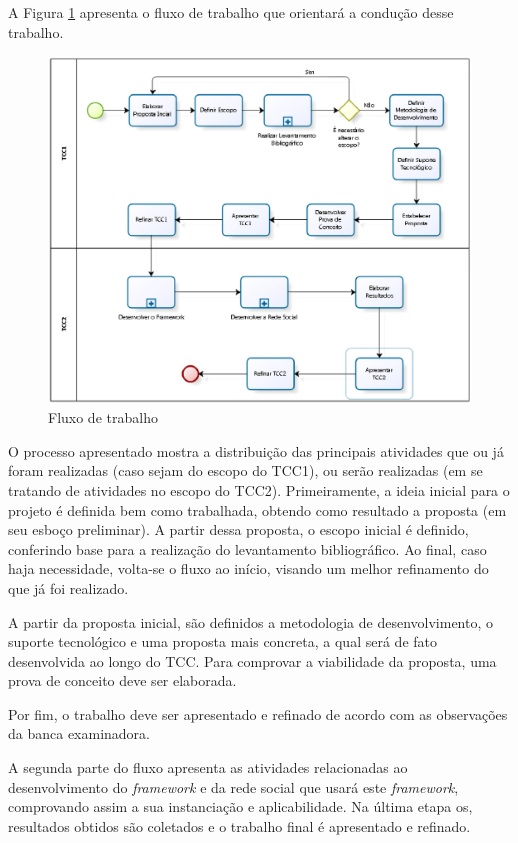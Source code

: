 A Figura \ref{processo tcc} apresenta o fluxo de trabalho que orientará a condução desse trabalho.

\begin{figure}[h]
	\centering
	\includegraphics[scale=0.6]{figuras/capitulo4/processo_tcc.eps}
	\caption{Fluxo de trabalho}
	\label{processo tcc}
\end{figure}

O processo apresentado mostra a distribuição das principais atividades que ou já foram realizadas (caso sejam do escopo do TCC1), ou serão realizadas (em se tratando de atividades no escopo do TCC2). Primeiramente, a ideia inicial para o projeto é definida bem como trabalhada, obtendo como resultado a proposta (em seu esboço preliminar). A partir dessa proposta, o escopo inicial é definido, conferindo base para a realização do levantamento bibliográfico. Ao final, caso haja necessidade, volta-se o fluxo ao início, visando um melhor refinamento do que já foi realizado.

A partir da proposta inicial, são definidos a metodologia de desenvolvimento, o suporte tecnológico e uma proposta mais concreta, a qual será de fato desenvolvida ao longo do TCC. Para comprovar a viabilidade da proposta, uma prova de conceito deve ser elaborada.

Por fim, o trabalho deve ser apresentado e refinado de acordo com as observações da banca examinadora.

A segunda parte do fluxo apresenta as atividades relacionadas ao desenvolvimento do \textit{framework} e da rede social que usará este \textit{framework}, comprovando assim a sua instanciação e aplicabilidade. Na última etapa os, resultados obtidos são coletados e o trabalho final é apresentado e refinado.

